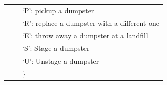 \documentclass{article}
\begin{document}
\begin{tabular}{ l | l | l }
                               & $                                                           $  &  `P': pickup a dumpster                                       \\
                               & $                                                           $  &  `R': replace a dumpster with a different one                 \\
                               & $                                                           $  &  `E': throw away a dumpster at a landfill                     \\
                               & $                                                           $  &  `S': Stage a dumpster                                        \\
                               & $                                                           $  &  `U': Unstage a dumpster                                      \\
                               & $                                                           $  & \}                                                            \\
\end{tabular}
\end{document}
